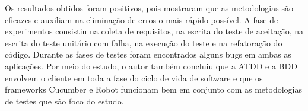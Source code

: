Os resultados obtidos foram positivos, pois mostraram que as metodologias são eficazes e auxiliam na eliminação de erros o mais rápido possível. A fase de experimentos consistiu na coleta de requisitos, na escrita do teste de aceitação, na escrita do teste unitário com falha, na execução do teste e na refatoração do código. Durante as fases de testes foram encontrados alguns bugs em ambas as aplicações. Por meio do estudo, o autor também concluiu que a ATDD e a BDD envolvem o cliente em toda a fase do ciclo de vida de software e que os frameworks Cucumber e Robot funcionam bem em conjunto com as metodologias de testes que são foco do estudo.

